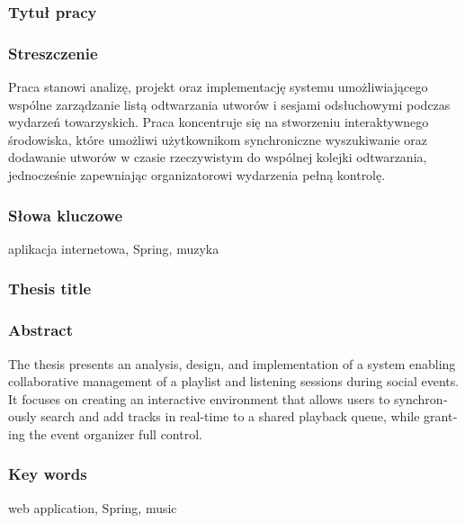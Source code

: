 \subsubsection*{Tytuł pracy} 
\Title

\subsubsection*{Streszczenie}  
Praca stanowi analizę, projekt oraz implementację systemu umożliwiającego wspólne zarządzanie listą odtwarzania utworów i sesjami odsłuchowymi podczas wydarzeń towarzyskich. Praca koncentruje się na stworzeniu interaktywnego środowiska, które umożliwi użytkownikom synchroniczne wyszukiwanie oraz dodawanie utworów w czasie rzeczywistym do wspólnej kolejki odtwarzania, jednocześnie zapewniając organizatorowi wydarzenia pełną kontrolę. 

\subsubsection*{Słowa kluczowe} 
aplikacja internetowa, Spring, muzyka

\subsubsection*{Thesis title} 
\begin{otherlanguage}{british}
\TitleAlt
\end{otherlanguage}

\subsubsection*{Abstract} 
\begin{otherlanguage}{british}
The thesis presents an analysis, design, and implementation of a system enabling collaborative management of a playlist and listening sessions during social events. It focuses on creating an interactive environment that allows users to synchronously search and add tracks in real-time to a shared playback queue, while granting the event organizer full control.
\end{otherlanguage}
\subsubsection*{Key words}  
\begin{otherlanguage}{british}
web application, Spring, music
\end{otherlanguage}

